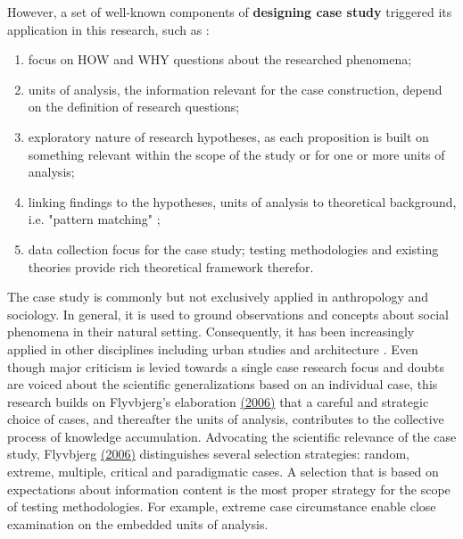 \documentclass[11pt]{report}
\begin{document}
However, a set of well-known components of \textbf{designing case study} triggered its application in this research, such as \cite{(Yin 2009)}:
\begin{enumerate}
\item focus on HOW and WHY questions about the researched phenomena;
\item units of analysis, the information relevant for the case construction, depend on the definition of research questions;
\item exploratory nature of research hypotheses, as each proposition is built on something relevant within the scope of the study or for one or more units of analysis;
\item linking findings to the hypotheses, units of analysis to theoretical background, i.e. "pattern matching" \cite{Campbell 1975};
\item data collection focus for the case study; testing methodologies and existing theories provide rich theoretical framework therefor.
\end{enumerate}

The case study is commonly but not exclusively applied in anthropology and sociology.
In general, it is used to ground observations and concepts about social phenomena in their natural setting. Consequently, it has been increasingly applied in other disciplines including urban studies and architecture \cite{(Feagin et al. 1991)}. Even though major criticism is levied towards a single case research focus and doubts are voiced about the scientific generalizations based on an individual case, this research builds on Flyvbjerg's elaboration \href{ref}{(2006)} that a careful and strategic choice of cases, and thereafter the units of analysis, contributes to the collective process of knowledge accumulation.
Advocating the scientific relevance of the case study, Flyvbjerg \href{ref}{(2006)} distinguishes several selection strategies: random, extreme, multiple, critical and paradigmatic cases. A selection that is based on expectations about information content is the most proper strategy for the scope of testing methodologies. For example, extreme case circumstance enable close examination on the embedded units of analysis.
\\
\end{document}
